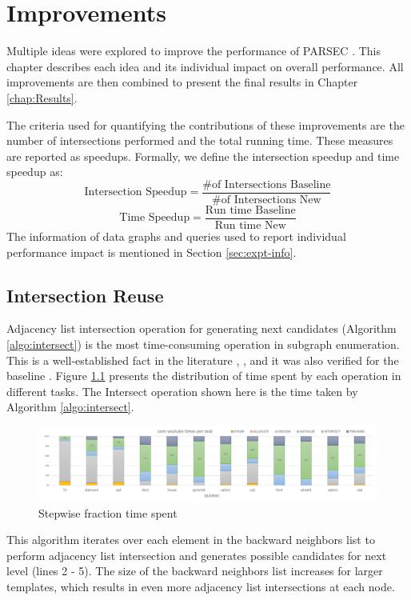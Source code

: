 \chapter{Improvements}
\label{chap:Improvements}
Multiple ideas were explored to improve the performance of PARSEC \cite{PARSEC_VD}.
This chapter describes each idea and its individual impact on overall performance.
All improvements are then combined to present the final results in Chapter \ref{chap:Results}.

The criteria used for quantifying the contributions of these improvements are the number of intersections performed and the total running time. These measures are reported as speedups. Formally, we define the intersection speedup and time speedup as:
$$
    \text{Intersection Speedup} = \frac{\text{\# of Intersections Baseline}}{\text{\# of Intersections New}}
$$
$$
    \text{Time Speedup} = \frac{\text{Run time Baseline}}{\text{Run time New}}
$$
The information of data graphs and queries used to report individual performance impact is mentioned in Section \ref{sec:expt-info}.

\section{Intersection Reuse}\label{sec:reuse-impl}
Adjacency list intersection operation for generating next candidates (Algorithm \ref{algo:intersect}) is the most time-consuming operation in subgraph enumeration.
This is a well-established fact in the literature \cite{RPS-paper}, \cite{LIGHT}, \cite{VF3} and it was also verified for the baseline \cite{PARSEC_VD}.
Figure \ref{fig:time-dist} presents the distribution of time spent by each operation in different tasks.
The Intersect operation shown here is the time taken by Algorithm \ref{algo:intersect}.
\begin{figure}
    \includegraphics[width=\textwidth]{fig/improvements/time-distributions-yt.png}
    \caption{Stepwise fraction time spent}
    \label{fig:time-dist}
\end{figure}
This algorithm iterates over each element in the backward neighbors list to perform adjacency list intersection and generates possible candidates for next level (lines 2 - 5).
The size of the backward neighbors list increases for larger templates, which results in even more adjacency list intersections at each node.

